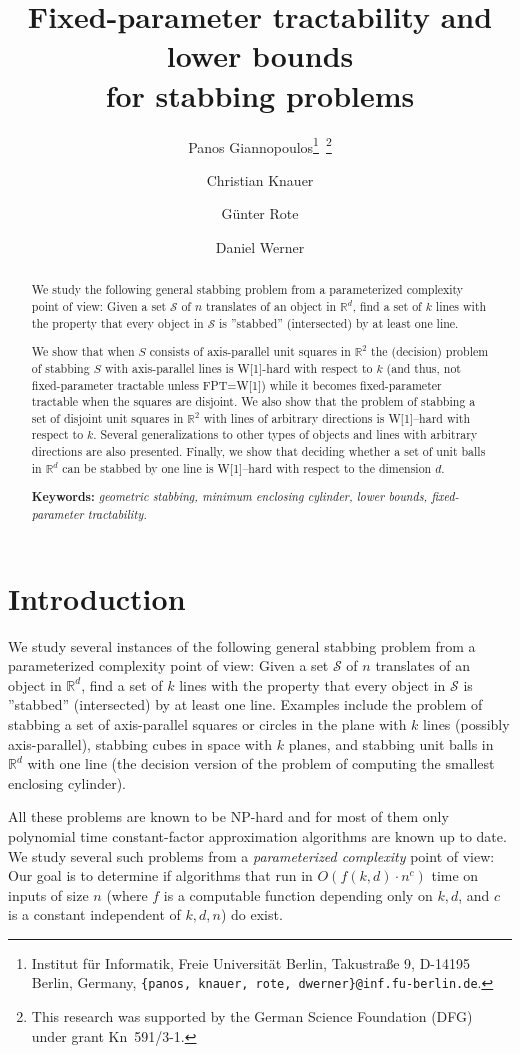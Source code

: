\documentclass[12pt]{article}
\title{Fixed-parameter tractability and lower bounds\\ for stabbing problems}
\author{ Panos Giannopoulos\thanks{Institut f{\"ur} Informatik, Freie Universit{\"a}t Berlin,
    Takustra{\ss}e 9, D-14195 Berlin, Germany, {\tt\{panos, knauer, rote,
    dwerner\}@inf.fu-berlin.de}.}{\ }\footnote{This research was
    supported by the German Science Foundation (DFG) under grant Kn~591/3-1.}
\and
Christian Knauer\footnotemark[1]{\ }\footnotemark[2]
\and
G{\"u}nter Rote\footnotemark[1]
\and
Daniel Werner\footnotemark[1]
}
\newcommand{\R}{\mathbb{R}}
\newcommand{\Rtwo}{\mathbb{R}^2}
\newcommand{\Rd}{\mathbb{R}^d}
\begin{document}
\maketitle

\begin{abstract}
We study the following general stabbing problem from
a parameterized complexity point of view: Given a set $\mathcal S$ of $n$ translates of an
object in $\Rd$, find a set of $k$ lines with the property that every
object in $\mathcal S$ is ''stabbed'' (intersected) by at least one line.

We show that when $S$ consists of axis-parallel unit squares in $\Rtwo$ the (decision) problem of stabbing $S$ with
axis-parallel lines is W[1]-hard with respect to $k$ (and thus, not fixed-parameter tractable
unless FPT=W[1]) while it becomes fixed-parameter tractable when the squares are disjoint.  
We also show that the problem of stabbing a set of disjoint unit squares in $\Rtwo$ with lines of arbitrary directions is 
W[1]--hard with respect to $k$.  
Several generalizations to other types of objects and lines with arbitrary directions are also presented. 
Finally, we show that deciding whether a set of unit balls in $\Rd$ can be stabbed by one line is W[1]--hard with respect to 
the dimension $d$. 

\noindent
  \textbf{Keywords:} \emph{geometric stabbing, minimum enclosing cylinder, 
         lower bounds, fixed-parameter tractability.} 
\end{abstract}





\section{Introduction}
We study several instances of the following general stabbing problem from
a parameterized complexity point of view: Given a set $\mathcal S$ of $n$ translates of an
object in $\Rd$, find a set of $k$ lines with the property that every
object in $\mathcal S$ is ''stabbed'' (intersected) by at least one line. 
Examples include the problem of stabbing a set of axis-parallel squares or circles in
the plane with $k$ lines (possibly axis-parallel), stabbing cubes in space
with $k$ planes, and stabbing unit balls in $\R^{d}$ with one line (the
decision version of the problem of computing the smallest enclosing
cylinder).

All these problems are known to be NP-hard and for most of them only 
polynomial time constant-factor approximation algorithms are known up to date.
We study several such problems from a \emph{parameterized complexity} point of
view: Our goal is to determine if algorithms that run in $O(f(k,d)\cdot
n^{c})$ time on inputs of size $n$ (where $f$ is a computable function
depending only on $k,d$, and $c$ is a constant independent of $k,d,n$) do
exist.
\end{document}
